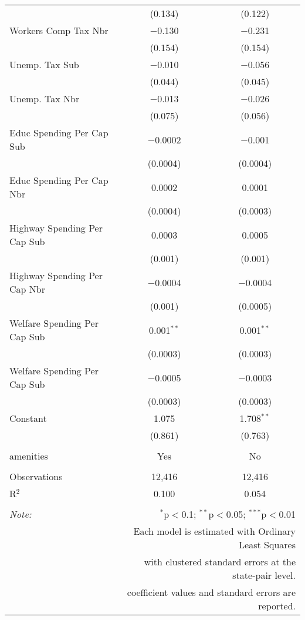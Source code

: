 \begin{table}[!htbp]
\begin{tabular}{@{\extracolsep{5pt}}lcc}
  & (0.134) & (0.122) \\ 
  Workers Comp Tax Nbr & $-$0.130 & $-$0.231 \\ 
  & (0.154) & (0.154) \\ 
  Unemp. Tax Sub & $-$0.010 & $-$0.056 \\ 
  & (0.044) & (0.045) \\ 
  Unemp. Tax Nbr & $-$0.013 & $-$0.026 \\ 
  & (0.075) & (0.056) \\ 
  Educ Spending Per Cap Sub & $-$0.0002 & $-$0.001 \\ 
  & (0.0004) & (0.0004) \\ 
  Educ Spending Per Cap Nbr & 0.0002 & 0.0001 \\ 
  & (0.0004) & (0.0003) \\ 
  Highway Spending Per Cap Sub & 0.0003 & 0.0005 \\ 
  & (0.001) & (0.001) \\ 
  Highway Spending Per Cap Nbr & $-$0.0004 & $-$0.0004 \\ 
  & (0.001) & (0.0005) \\ 
  Welfare Spending Per Cap Sub & 0.001$^{**}$ & 0.001$^{**}$ \\ 
  & (0.0003) & (0.0003) \\ 
  Welfare Spending Per Cap Sub & $-$0.0005 & $-$0.0003 \\ 
  & (0.0003) & (0.0003) \\ 
  Constant & 1.075 & 1.708$^{**}$ \\ 
  & (0.861) & (0.763) \\ 
 \hline \\[-1.8ex] 
amenities & Yes & No \\ 
\hline \\[-1.8ex] 
Observations & 12,416 & 12,416 \\ 
R$^{2}$ & 0.100 & 0.054 \\ 
\hline 
\hline \\[-1.8ex] 
\textit{Note:}  & \multicolumn{2}{r}{$^{*}$p$<$0.1; $^{**}$p$<$0.05; $^{***}$p$<$0.01} \\ 
 & \multicolumn{2}{r}{Each model is estimated with Ordinary Least Squares} \\ 
 & \multicolumn{2}{r}{with clustered standard errors at the state-pair level.} \\ 
 & \multicolumn{2}{r}{coefficient values and standard errors are reported.} \\ 
\end{tabular} 
\end{table} 
